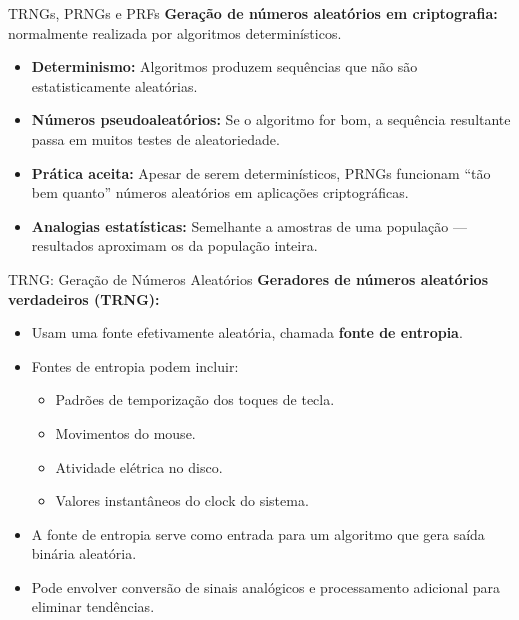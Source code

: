 \begin{frame}{TRNGs, PRNGs e PRFs}
    \textbf{Geração de números aleatórios em criptografia:} normalmente realizada por algoritmos determinísticos.

    \medskip
    \begin{itemize}
        \item \textbf{Determinismo:} Algoritmos produzem sequências que não são estatisticamente aleatórias.
        \item \textbf{Números pseudoaleatórios:} Se o algoritmo for bom, a sequência resultante passa em muitos testes de aleatoriedade.
        \item \textbf{Prática aceita:} Apesar de serem determinísticos, PRNGs funcionam “tão bem quanto” números aleatórios em aplicações criptográficas.
        \item \textbf{Analogias estatísticas:} Semelhante a amostras de uma população — resultados aproximam os da população inteira.
    \end{itemize}

\end{frame}

\begin{frame}{TRNG: Geração de Números Aleatórios}
    \textbf{Geradores de números aleatórios verdadeiros (TRNG):}
    \begin{itemize}
        \item Usam uma fonte efetivamente aleatória, chamada \textbf{fonte de entropia}.
        \item Fontes de entropia podem incluir:
              \begin{itemize}
                  \item Padrões de temporização dos toques de tecla.
                  \item Movimentos do mouse.
                  \item Atividade elétrica no disco.
                  \item Valores instantâneos do clock do sistema.
              \end{itemize}
        \item A fonte de entropia serve como entrada para um algoritmo que gera saída binária aleatória.
        \item Pode envolver conversão de sinais analógicos e processamento adicional para eliminar tendências.
    \end{itemize}



\end{frame}

